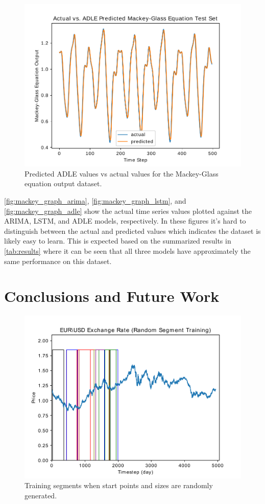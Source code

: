 \documentclass{article}
\begin{document}
\begin{figure}
\endminipage\hfill
{}
	\centering
  \includegraphics[scale=0.28]{imgs/adle_results_mackey.pdf}
  \caption{Predicted ADLE values vs actual values for the Mackey-Glass equation output dataset.}\label{fig:mackey_graph_adle}
\endminipage
\end{figure}

\autoref{fig:mackey_graph_arima}, \autoref{fig:mackey_graph_lstm}, and \autoref{fig:mackey_graph_adle} show the actual time series values plotted against the ARIMA, LSTM, and ADLE models, respectively. In these figures it's hard to distinguish between the actual and predicted values which indicates the dataset is likely easy to learn. This is expected based on the summarized results in \autoref{tab:results} where it can be seen that all three models have approximately the same performance on this dataset.


\section{Conclusions and Future Work}

\begin{figure}
\centering
\includegraphics[scale=0.4]{imgs/random_segments_forex.pdf}
   \caption{Training segments when start points and sizes are randomly generated.}\label{fig:random}
\end{figure}
\end{document}
